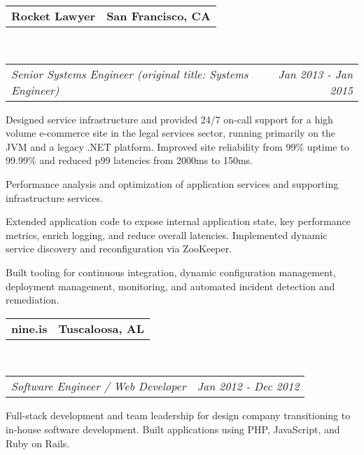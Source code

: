 \documentclass[12pt,letterpaper]{article}
\makeatletter
\newcommand{\lineunder}{\vspace*{-8pt} \\ \hspace*{-18pt} \hrulefill \\}
\newcommand{\header}[1]{{\hspace*{-15pt}\vspace*{6pt} \textsc{#1}} \vspace*{-6pt} \lineunder}
\newcommand{\headerrow}[2]
{\begin{tabular*}{\linewidth}{l@{\extracolsep{\fill}}r}
	#1 &
	#2 \\
\end{tabular*}}
\newcommand{\employment}[5]{
	\headerrow
		{\textbf{#1}}
		{\textbf{#2}}
	\\
	\headerrow
		{\emph{#3}}
		{\emph{#4}}
	\begin{itemize*}
		\item #5
	\end{itemize*}
}
\makeatother
\begin{document}
\employment{Rocket Lawyer}{San Francisco, CA}{Senior Systems Engineer (original
  title: Systems Engineer)}{Jan 2013 - Jan 2015}{
Designed service infrastructure and provided 24/7 on-call support for a high
volume e-commerce site in the legal services sector, running primarily on the
JVM and a legacy .NET platform. Improved site reliability from 99\% uptime to 99.99\%
and reduced p99 latencies from 2000ms to 150ms.
\item Performance analysis and optimization of application services and supporting infrastructure services.
\item Extended application code to expose internal application
  state, key performance metrics, enrich logging, and reduce overall latencies.
  Implemented dynamic service discovery and reconfiguration via ZooKeeper.
\item Built tooling for continuous integration, dynamic configuration
  management, deployment management, monitoring, and automated incident
  detection and remediation.
}

\employment{nine.is}{Tuscaloosa, AL}{Software Engineer / Web Developer}{Jan 2012 - Dec 2012}{
Full-stack development and team leadership for design company transitioning to in-house software development. Built applications using PHP, JavaScript, and Ruby on Rails.
}
\end{document}
